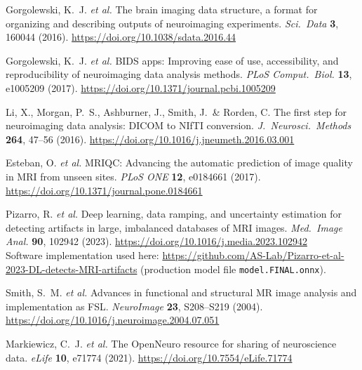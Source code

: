 \documentclass[11pt,letterpaper]{article}
\begin{document}
\begin{enumerate}[leftmargin=*,itemsep=0.65em,label={[\arabic*]}]

  \item \label{ref:bids}
  Gorgolewski, K.~J. \textit{et al.}
  The brain imaging data structure, a format for organizing and describing
  outputs of neuroimaging experiments.
  \textit{Sci.\ Data} \textbf{3}, 160044 (2016).
  \url{https://doi.org/10.1038/sdata.2016.44}

  \item \label{ref:bidsapps}
  Gorgolewski, K.~J. \textit{et al.}
  BIDS apps: Improving ease of use, accessibility, and reproducibility of
  neuroimaging data analysis methods.
  \textit{PLoS Comput.\ Biol.} \textbf{13}, e1005209 (2017).
  \url{https://doi.org/10.1371/journal.pcbi.1005209}

  \item \label{ref:dcm2niix}
  Li, X., Morgan, P.~S., Ashburner, J., Smith, J.\ \& Rorden, C.
  The first step for neuroimaging data analysis: DICOM to NIfTI conversion.
  \textit{J.\ Neurosci.\ Methods} \textbf{264}, 47--56 (2016).
  \url{https://doi.org/10.1016/j.jneumeth.2016.03.001}

  \item \label{ref:mriqc}
  Esteban, O. \textit{et al.}
  MRIQC: Advancing the automatic prediction of image quality in MRI from unseen
  sites.
  \textit{PLoS ONE} \textbf{12}, e0184661 (2017).
  \url{https://doi.org/10.1371/journal.pone.0184661}

  \item \label{ref:pizarro}
  Pizarro, R. \textit{et al.}
  Deep learning, data ramping, and uncertainty estimation for detecting
  artifacts in large, imbalanced databases of MRI images.
  \textit{Med.\ Image Anal.} \textbf{90}, 102942 (2023).
  \url{https://doi.org/10.1016/j.media.2023.102942}\\
  Software implementation used here:
  \url{https://github.com/AS-Lab/Pizarro-et-al-2023-DL-detects-MRI-artifacts}
  (production model file \texttt{model.FINAL.onnx}).

  \item \label{ref:fsl}
  Smith, S.~M. \textit{et al.}
  Advances in functional and structural MR image analysis and implementation as
  FSL.
  \textit{NeuroImage} \textbf{23}, S208--S219 (2004).
  \url{https://doi.org/10.1016/j.neuroimage.2004.07.051}

  \item \label{ref:openneuro}
  Markiewicz, C.~J. \textit{et al.}
  The OpenNeuro resource for sharing of neuroscience data.
  \textit{eLife} \textbf{10}, e71774 (2021).
  \url{https://doi.org/10.7554/eLife.71774}


\end{enumerate}
\end{document}
